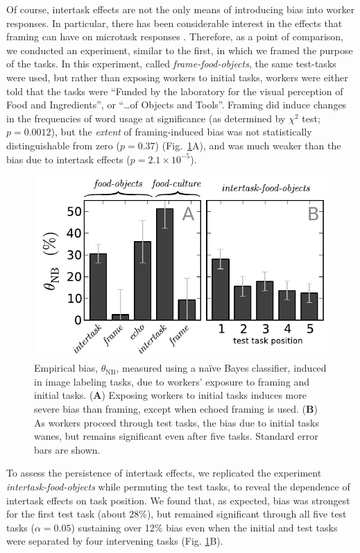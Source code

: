 \documentclass{pnastwo}
\begin{document}
\begin{article}
Of course, intertask effects are not the only means of introducing bias into
worker responses. In particular, there has been considerable interest in the effects that
framing can have on microtask responses
\cite{Kinnaird2012281,chandler2013breaking,thibodeau2013natural}. Therefore, as a point of
comparison, we conducted an experiment, similar to the first, in which we
framed the purpose of the tasks.  In this experiment, called
\textit{frame-food-objects}, the same test-tasks were used, but rather than
exposing workers to initial tasks, workers were either told that the tasks were
``Funded by the laboratory for the visual perception of Food and Ingredients'',
or ``\ldots of Objects and Tools''.  Framing did induce changes in the
frequencies of word usage at significance (as determined by $\chi^2$ test;
$p=0.0012$), but the \textit{extent} of framing-induced bias was not
statistically distinguishable from zero ($p =0.37$) (Fig.~\ref{fig:theta}A),
and was much weaker than the bias due to intertask effects ($p=2.1\times
10^{-5}$).

\begin{figure}
	\centering
	\includegraphics[scale=0.8]{figs/theta.pdf}
	\caption{
		Empirical bias, $\theta_\mathrm{NB}$, measured using a na\"ive Bayes 
		classifier, induced in image labeling tasks, due to workers' 
		exposure to framing and initial tasks.  
		(\textbf{A}) Exposing workers to initial tasks induces more severe
		bias than framing, except when echoed framing is used. 
		(\textbf{B}) As workers proceed through test tasks, 
		the bias due to initial tasks wanes, 
		but remains significant even after five tasks.  
		Standard error bars are shown.
	\label{fig:theta}
	}
\end{figure}

To assess the persistence of intertask effects, we replicated the experiment
\textit{intertask-food-objects} while permuting the test tasks, to reveal the
dependence of intertask effects on task position.  We found that, as expected,
bias was strongest for the first test task (about 28\%), but remained
significant through all five test tasks ($\alpha=0.05$) sustaining over 12\%
bias even when the initial and test tasks were separated by four intervening
tasks (Fig. \ref{fig:theta}B).


\end{article}
\end{document}
